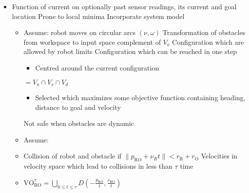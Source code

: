 \begin{itemize}
    \item Function of current on optionally past sensor readings, its current and goal location
    \icon Prone to local minima
    \ipro Incorporate system model
        \begin{itemize}
            \item Assume: robot moves on circular arcs $(\nu, \omega)$
             Transformation of obstacles from workspace to input space
             complement of $V_o$
             Configuration which are allowed by robot limits
             Configuration which can be reached in one step
                \begin{itemize}
                    \item Centred around the current configuration
                \end{itemize}
             $= V_a \cap V_s \cap V_d$
                \begin{itemize}
                    \item Selected which maximizes some objective function containing heading, distance to goal and velocity
                \end{itemize}
            \icon Not safe when obstacles are dynamic
        \end{itemize}
        \begin{itemize}
            \item Assume:
            \item Collision of robot and obstacle if $\lVert p_\text{RO} + \nu_R t \rVert < r_\text{R} + r_\text{O}$
             Velocities in velocity space which lead to collisions in less than $\tau$ time
        \item $\text{VO}_\text{RO}^\tau = \bigcup_{0 \le t \le \tau} D(-\frac{p_\text{RO}}{t}, \frac{r_\text{RO}}{t})$

\end{itemize}
\end{itemize}
